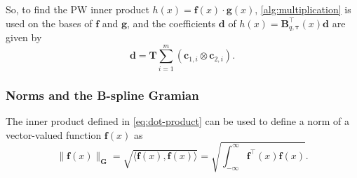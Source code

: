 So, to find the PW inner product $h(x) = \mathbf f(x) \cdot \mathbf g(x)$, \cref{alg:multiplication} is used on the bases of $\mathbf f$ and $\mathbf g$, and the coefficients $\mathbf d$ of $h(x) = \mathbf B_{q, \boldsymbol{\tau}}^\top(x) \mathbf d$ are given by
\begin{equation}
    \mathbf d = \mathbf T \sum_{i=1}^m (\mathbf c_{1,i} \otimes \mathbf c_{2,i}).
\end{equation}


%     


\subsubsection{Norms and the B-spline Gramian}\label{sec:norms}
The inner product defined in \cref{eq:dot-product} can be used to define a norm of a vector-valued function $\mathbf f(x)$ as
\begin{equation}
    \label{eq:norm}
    \|\mathbf f(x)\|_\mathbf G = \sqrt{\langle\mathbf f(x), \mathbf f(x)\rangle} = \sqrt{\int_{-\infty}^\infty \mathbf f^\top(x) \mathbf f(x)}.
\end{equation}

